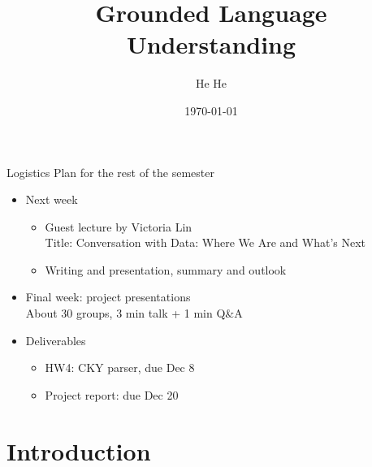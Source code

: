\documentclass[usenames,dvipsnames,notes]{beamer}
\title[CSCI-GA.2590]{Grounded Language Understanding}
\author[He He]{He He
}
\institute[NYU]{New York University}
\date{\today}
\begin{document}
\begin{frame}
\titlepage
\end{frame}

\begin{frame}
    {Logistics}
    Plan for the rest of the semester\\
    \begin{itemize}
        \item Next week
            \begin{itemize}
                \item Guest lecture by Victoria Lin\\
                Title: Conversation with Data: Where We Are and What's Next
            \item Writing and presentation, summary and outlook
            \end{itemize}
        \item Final week: project presentations\\
            About 30 groups, 3 min talk + 1 min Q\&A
        \item Deliverables
            \begin{itemize}
                \item HW4: CKY parser, due Dec 8
                \item Project report: due Dec 20 
            \end{itemize}
    \end{itemize}
\end{frame}

\section{Introduction}
\end{document}
